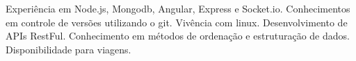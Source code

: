 \begin{cvletter}
    Experiência em Node.js, Mongodb, Angular, Express e Socket.io. 
    Conhecimentos em controle de versões utilizando o git. Vivência com linux. 
    Desenvolvimento de APIs RestFul. Conhecimento em métodos de ordenação e 
    estruturação de dados. Disponibilidade para viagens.
\end{cvletter}
